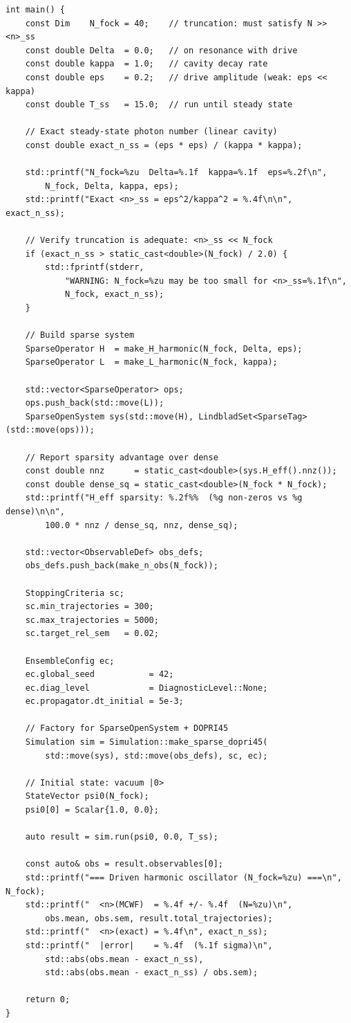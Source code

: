 \documentclass[11pt,a4paper,twoside]{book}
\theoremstyle{definition}
\theoremstyle{remark}
\begin{document}
\begin{verbatim}
int main() {
    const Dim    N_fock = 40;    // truncation: must satisfy N >> <n>_ss
    const double Delta  = 0.0;   // on resonance with drive
    const double kappa  = 1.0;   // cavity decay rate
    const double eps    = 0.2;   // drive amplitude (weak: eps << kappa)
    const double T_ss   = 15.0;  // run until steady state

    // Exact steady-state photon number (linear cavity)
    const double exact_n_ss = (eps * eps) / (kappa * kappa);

    std::printf("N_fock=%zu  Delta=%.1f  kappa=%.1f  eps=%.2f\n",
        N_fock, Delta, kappa, eps);
    std::printf("Exact <n>_ss = eps^2/kappa^2 = %.4f\n\n", exact_n_ss);

    // Verify truncation is adequate: <n>_ss << N_fock
    if (exact_n_ss > static_cast<double>(N_fock) / 2.0) {
        std::fprintf(stderr,
            "WARNING: N_fock=%zu may be too small for <n>_ss=%.1f\n",
            N_fock, exact_n_ss);
    }

    // Build sparse system
    SparseOperator H  = make_H_harmonic(N_fock, Delta, eps);
    SparseOperator L  = make_L_harmonic(N_fock, kappa);

    std::vector<SparseOperator> ops;
    ops.push_back(std::move(L));
    SparseOpenSystem sys(std::move(H), LindbladSet<SparseTag>(std::move(ops)));

    // Report sparsity advantage over dense
    const double nnz      = static_cast<double>(sys.H_eff().nnz());
    const double dense_sq = static_cast<double>(N_fock * N_fock);
    std::printf("H_eff sparsity: %.2f%%  (%g non-zeros vs %g dense)\n\n",
        100.0 * nnz / dense_sq, nnz, dense_sq);

    std::vector<ObservableDef> obs_defs;
    obs_defs.push_back(make_n_obs(N_fock));

    StoppingCriteria sc;
    sc.min_trajectories = 300;
    sc.max_trajectories = 5000;
    sc.target_rel_sem   = 0.02;

    EnsembleConfig ec;
    ec.global_seed           = 42;
    ec.diag_level            = DiagnosticLevel::None;
    ec.propagator.dt_initial = 5e-3;

    // Factory for SparseOpenSystem + DOPRI45
    Simulation sim = Simulation::make_sparse_dopri45(
        std::move(sys), std::move(obs_defs), sc, ec);

    // Initial state: vacuum |0>
    StateVector psi0(N_fock);
    psi0[0] = Scalar{1.0, 0.0};

    auto result = sim.run(psi0, 0.0, T_ss);

    const auto& obs = result.observables[0];
    std::printf("=== Driven harmonic oscillator (N_fock=%zu) ===\n", N_fock);
    std::printf("  <n>(MCWF)  = %.4f +/- %.4f  (N=%zu)\n",
        obs.mean, obs.sem, result.total_trajectories);
    std::printf("  <n>(exact) = %.4f\n", exact_n_ss);
    std::printf("  |error|    = %.4f  (%.1f sigma)\n",
        std::abs(obs.mean - exact_n_ss),
        std::abs(obs.mean - exact_n_ss) / obs.sem);

    return 0;
}
\end{verbatim}
\end{document}
